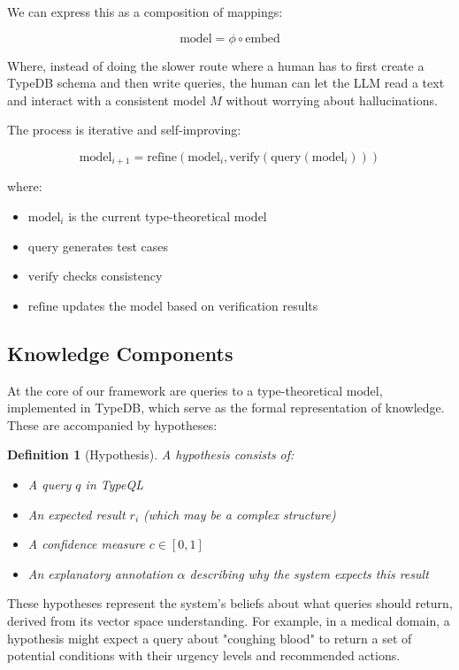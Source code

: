 \documentclass[11pt]{article}
\newtheorem{definition}{Definition}
\begin{document}
We can express this as a composition of mappings:

\[
\text{model} = \phi \circ \text{embed}
\]

Where, instead of doing the slower route where a human has to first create a TypeDB schema and then write queries, the human can let the LLM read a text and interact with a consistent model $M$ without worrying about hallucinations.  

The process is iterative and self-improving:

\[
\text{model}_{i+1} = \text{refine}(\text{model}_i, \text{verify}(\text{query}(\text{model}_i)))
\]

where:
\begin{itemize}
    \item $\text{model}_i$ is the current type-theoretical model
    \item $\text{query}$ generates test cases
    \item $\text{verify}$ checks consistency
    \item $\text{refine}$ updates the model based on verification results
\end{itemize}

\subsection{Knowledge Components}
At the core of our framework are queries to a type-theoretical model, implemented in TypeDB, which serve as the formal representation of knowledge. These are accompanied by hypotheses:

\begin{definition}[Hypothesis]
A hypothesis consists of:
\begin{itemize}
    \item A query $q$ in TypeQL
    \item An expected result $r_i$ (which may be a complex structure)
    \item A confidence measure $c \in [0,1]$
    \item An explanatory annotation $\alpha$ describing why the system expects this result
\end{itemize}
\end{definition}
These hypotheses represent the system's beliefs about what queries should return, derived from its vector space understanding. For example, in a medical domain, a hypothesis might expect a query about "coughing blood" to return a set of potential conditions with their urgency levels and recommended actions.
\end{document}

